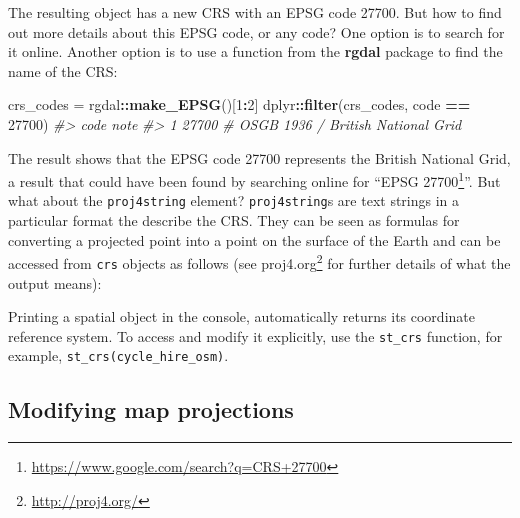 \documentclass[]{krantz}
\newenvironment{Shaded}{\begin{snugshade}}{\end{snugshade}}
\newcommand{\CommentTok}[1]{\textcolor[rgb]{0.37,0.37,0.37}{\textit{#1}}}
\newcommand{\DecValTok}[1]{\textcolor[rgb]{0.06,0.06,0.06}{#1}}
\newcommand{\KeywordTok}[1]{\textcolor[rgb]{0.27,0.27,0.27}{\textbf{#1}}}
\newcommand{\NormalTok}[1]{#1}
\newcommand{\OperatorTok}[1]{\textcolor[rgb]{0.43,0.43,0.43}{\textbf{#1}}}
\newcommand{\StringTok}[1]{\textcolor[rgb]{0.5,0.5,0.5}{#1}}
\let\rmarkdownfootnote\footnote%
\def\footnote{\protect\rmarkdownfootnote}
\renewcommand{\href}[2]{#2\footnote{\url{#1}}}
\let\BeginKnitrBlock\begin \let\EndKnitrBlock\end
\begin{document}
The resulting object has a new CRS with an EPSG code 27700.
But how to find out more details about this EPSG code, or any code?
One option is to search for it online.
Another option is to use a function from the \textbf{rgdal} package to find the name of the CRS:

\begin{Shaded}
\begin{Highlighting}[]
\NormalTok{crs_codes =}\StringTok{ }\NormalTok{rgdal}\OperatorTok{::}\KeywordTok{make_EPSG}\NormalTok{()[}\DecValTok{1}\OperatorTok{:}\DecValTok{2}\NormalTok{]}
\NormalTok{dplyr}\OperatorTok{::}\KeywordTok{filter}\NormalTok{(crs_codes, code }\OperatorTok{==}\StringTok{ }\DecValTok{27700}\NormalTok{)}
\CommentTok{#>    code                                note}
\CommentTok{#> 1 27700 # OSGB 1936 / British National Grid}
\end{Highlighting}
\end{Shaded}

The result shows that the EPSG code 27700 represents the British National Grid, a result that could have been found by searching online for ``\href{https://www.google.com/search?q=CRS+27700}{EPSG 27700}''.
But what about the \texttt{proj4string} element?
\texttt{proj4string}s are text strings in a particular format the describe the CRS.
They can be seen as formulas for converting a projected point into a point on the surface of the Earth and can be accessed from \texttt{crs} objects as follows (see \href{http://proj4.org/}{proj4.org} for further details of what the output means):

\begin{Shaded}
\end{Shaded}

\BeginKnitrBlock{rmdnote}
Printing a spatial object in the console, automatically returns its coordinate reference system.
To access and modify it explicitly, use the \texttt{st\_crs} function, for example, \texttt{st\_crs(cycle\_hire\_osm)}.
\EndKnitrBlock{rmdnote}

\hypertarget{modifying-map-projections}{%
\subsection{Modifying map projections}\label{modifying-map-projections}}
\end{document}
